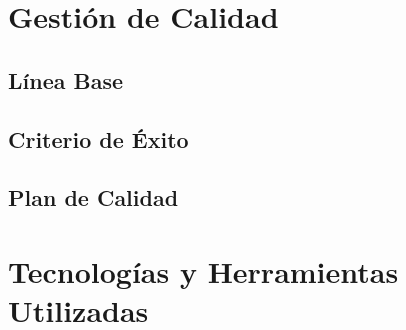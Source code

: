 \section{Gestión de Calidad}
\subsection{Línea Base}
\subsection{Criterio de Éxito}
\subsection{Plan de Calidad}

\section{Tecnologías y Herramientas Utilizadas}
